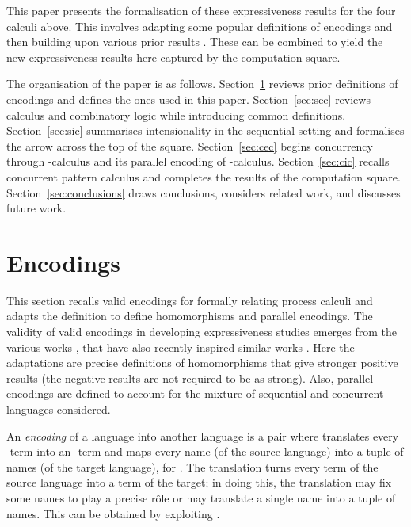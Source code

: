 \documentclass{llncs}
\newcommand{\withrw}[1]{#1}
\begin{document}
This paper presents the formalisation of these expressiveness results for the four calculi above.
This involves adapting some popular definitions of encodings \cite{G:IC08,G:DC10,G:CONCUR08}
and then building upon various prior results
\cite{Curry58combinatorylogic,90426,milner.parrow.ea:calculus-mobile,GivenWilsonGorlaJay10,JayGW11,GivenWilsonPHD}.
These can be combined to yield the new expressiveness results here captured by the
computation square.

The organisation of the paper is as follows.
Section~\ref{sec:encoding} reviews prior definitions of encodings and defines the ones used in this paper.
Section~\ref{sec:sec} reviews -calculus and combinatory logic while introducing common definitions.
Section~\ref{sec:sic} summarises intensionality in the sequential setting and formalises the arrow across the top of the square.
Section~\ref{sec:cec} begins concurrency through -calculus and its parallel encoding of -calculus.
Section~\ref{sec:cic} recalls concurrent pattern calculus and completes the results of the computation square.
Section~\ref{sec:conclusions} draws conclusions, \withrw{considers related work,} and discusses future work.

\section{Encodings}
\label{sec:encoding}

This section recalls valid encodings \cite{G:CONCUR08}
for formally relating process calculi and adapts the definition to define homomorphisms and
parallel encodings.
The validity of valid encodings in developing expressiveness studies emerges from the
various works \cite{G:IC08,G:DC10,G:CONCUR08}, that have also recently inspired similar works
\cite{LPSS10,LVF10,gla12}.
Here the adaptations are precise definitions of homomorphisms that give stronger positive
results (the negative results are not required to be as strong).
Also, parallel encodings are defined to
account for the mixture of sequential and concurrent languages considered.


An {\em encoding} of a language  into another language  is a pair
 where  translates every -term into
an -term and  maps every name (of the source language) into a tuple
of  names (of the target language), for .
The translation  turns every term of the source language into a term of the
target; in doing this, the translation may fix some names to play a precise r\^ole 
or may translate a single name into a tuple of names. This can be obtained
by exploiting .
\end{document}
